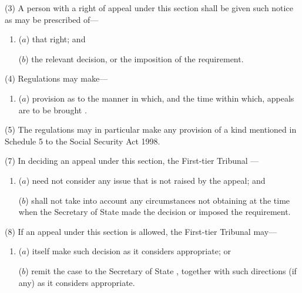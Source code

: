 \documentclass[12pt,a4paper]{article}
\begin{document}
(3) A person with a right of appeal under this section shall be given such notice as may be prescribed of—
\begin{enumerate}\item[]
($a$) that right; and

($b$) the relevant decision, or the imposition of the requirement.
\end{enumerate}

(4) Regulations may make—
\begin{enumerate}\item[]
($a$) provision as to the manner in which, and the time within which, appeals are to be brought%
.
\end{enumerate}

(5) The regulations may in particular make any provision of a kind mentioned in Schedule 5 to the Social Security Act 1998. 


(7) In deciding an appeal under this section, 
the First-tier Tribunal%
—
\begin{enumerate}\item[]
($a$) need not consider any issue that is not raised by the appeal; and

($b$) shall not take into account any circumstances not obtaining at the time when the 
Secretary of State  %
made the decision or imposed the requirement.
\end{enumerate}

(8) If an appeal under this section is allowed, the 
First-tier Tribunal  %
may—
\begin{enumerate}\item[]
($a$) itself make such decision as it considers appropriate; or

($b$) remit the case to the 
Secretary of State%
, together with such directions (if any) as it considers appropriate.
\end{enumerate}
\end{document}

